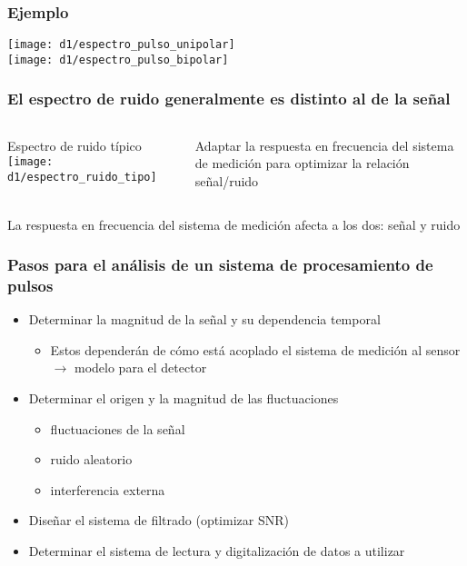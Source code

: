 \documentclass{beamer}
\begin{document}
\begin{frame}
\frametitle{Ejemplo}
\begin{block}{}
\texttt{[image: d1/espectro\_pulso\_unipolar]} \\
\texttt{[image: d1/espectro\_pulso\_bipolar]} 
\end{block}
\end{frame} 

\begin{frame}
\frametitle{\small{El espectro de ruido generalmente es distinto al de la
señal}}
\begin{columns}
\begin{column}{0.5\textwidth}
\begin{block}{\small{Espectro de ruido típico}}
\texttt{[image: d1/espectro\_ruido\_tipo]}
\end{block}
\end{column}
\begin{column}{0.48\textwidth}
\begin{alertblock}{}
Adaptar la respuesta en frecuencia del sistema de medición para optimizar la
relación señal/ruido
\end{alertblock}
\end{column}
\end{columns}
\begin{block}{}
La respuesta en frecuencia del sistema de medición \alert{afecta a los dos}: señal y
ruido
\end{block}
\end{frame} 

\begin{frame}
\frametitle{Pasos para el análisis de un sistema de procesamiento de pulsos}
\begin{exampleblock}{}
\begin{itemize}
\item Determinar la magnitud de la señal y su dependencia temporal 
\begin{itemize}
\item Estos dependerán de cómo está acoplado el sistema de medición al sensor
$\rightarrow$ \alert{modelo} para el detector
\end{itemize}
\item Determinar el origen y la magnitud de las fluctuaciones 
\begin{itemize}
\item fluctuaciones de la señal
\item ruido aleatorio
\item interferencia externa
\end{itemize}
\item Diseñar el sistema de filtrado (optimizar SNR)
\item Determinar el sistema de lectura y digitalización de datos a utilizar
\end{itemize}
\end{exampleblock}
\end{frame} 
\end{document}
